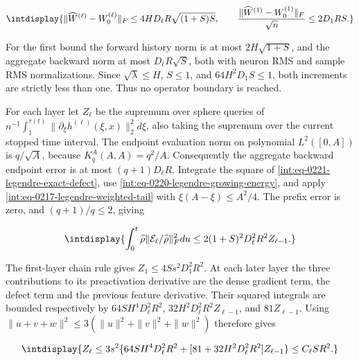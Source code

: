 \begingroup\renewcommand{\theHequation}{intdisplay.521}
\begin{equation*}
\intdisplay{
\|\widehat W^{(\ell)}-W_0^{(\ell)}\|_F
\le4HD_\ell R\sqrt{(1+S)S},\qquad
\frac{\|\widehat W^{(1)}-W_0^{(1)}\|_F}{\sqrt n}
\le2D_1RS.
}
\end{equation*}
\endgroup


For the first bound the forward history norm is at most \(2H\sqrt{1+S}\), and the aggregate backward norm at most \(D_\ell R\sqrt S\), both with neuron RMS and sample RMS normalizations. Since \(\sqrt\lambda\le H\), \(S\le1\), and \(64H^2D_1S\le1\), both increments are strictly less than one. Thus no operator boundary is reached.



For each layer let \(Z_\ell\) be the supremum over sphere queries of \(n^{-1}\int_1^{\tau(t)}\|\partial_\xi h^{(\ell)}(\xi,\allowbreak x)\|_2^2d\xi\), also taking the supremum over the current stopped time interval. The endpoint evaluation norm on polynomial \(L^2([0,\allowbreak A])\) is \(q/\sqrt A\), because \(K_q^A(A,\allowbreak A)=q^2/A\). Consequently the aggregate backward endpoint error is at most \((q+1)D_\ell R\). Integrate the square of \eqref{int:eq-0221-legendre-exact-defect}, use \eqref{int:eq-0220-legendre-growing-energy}, and apply \eqref{int:eq-0217-legendre-weighted-tail} with \(\xi(A-\xi)\le A^2/4\). The prefix error is zero, and \((q+1)/q\le2\), giving


\begingroup\renewcommand{\theHequation}{intdisplay.522}
\begin{equation}
\intdisplay{
\int_0^t\widehat\rho
\|\mathcal E_\ell/\widehat\rho\|_F^2du
\le2(1+S)^2D_\ell^2R^2Z_{\ell-1}.
}
\label{int:eq-0222-legendre-defect-energy}
\end{equation}
\endgroup


The first-layer chain rule gives \(Z_1\le4Ss^2D_1^2R^2\). At each later layer the three contributions to its preactivation derivative are the dense gradient term, the defect term and the previous feature derivative. Their squared integrals are bounded respectively by \(64SH^4D_\ell^2R^2\), \(32H^2D_\ell^2R^2Z_{\ell-1}\), and \(81Z_{\ell-1}\). Using \(\|u+v+w\|^2\le3(\|u\|^2+\|v\|^2+\|w\|^2)\) therefore gives


\begingroup\renewcommand{\theHequation}{intdisplay.523}
\begin{equation}
\intdisplay{
Z_\ell\le3s^2\{64SH^4D_\ell^2R^2+
[81+32H^2D_\ell^2R^2]Z_{\ell-1}\}
\le C_\ell SR^2.
}
\label{int:eq-0223-legendre-feature-energy}
\end{equation}
\endgroup

